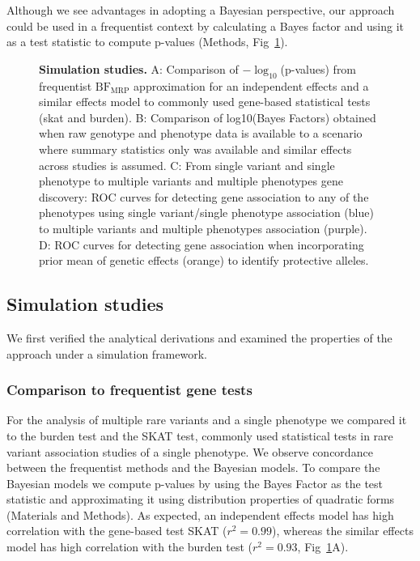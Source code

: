 Although we see advantages in adopting a Bayesian perspective, our approach could be used in a frequentist context by calculating a Bayes factor and using it as a test statistic to compute p-values (Methods, Fig~\ref{simresults}).
 
\begin{figure}[!h]
\caption{{\bf Simulation studies.}
A: Comparison of $-\log_{10}$(p-values) from frequentist $\textrm{BF}_{\textrm{MRP}}$ approximation for an independent effects and a similar effects model to commonly used gene-based statistical tests (skat and burden). B: Comparison of log10(Bayes Factors) obtained when raw genotype and phenotype data is available to a scenario where summary statistics only was available and similar effects across studies is assumed. C: From single variant and single phenotype to multiple variants and multiple phenotypes gene discovery: ROC curves for detecting gene association to any of the phenotypes using single variant/single phenotype association (blue) to multiple variants and multiple phenotypes association (purple). D: ROC curves for detecting gene association when incorporating prior mean of genetic effects (orange) to identify protective alleles.}
\label{simresults}
\end{figure}

\subsection*{Simulation studies}
We first verified the analytical derivations and examined the properties of the approach under a simulation framework. 

\subsubsection*{Comparison to frequentist gene tests}
For the analysis of multiple rare variants and a single phenotype we compared it to the burden test and the SKAT test, commonly used statistical tests in rare variant association studies of a single phenotype. We observe concordance between the frequentist methods and the Bayesian models. To compare the Bayesian models we compute p-values by using the Bayes Factor as the test statistic and approximating it using distribution properties of quadratic forms (Materials and Methods). As expected, an independent effects model has high correlation with the gene-based test SKAT ($r^2 = 0.99$), whereas the similar effects model has high correlation with the burden test ($r^2 = 0.93$, Fig~\ref{simresults}A). 

